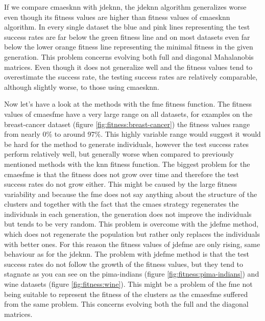 \documentclass[12pt,a4paper]{report}
\begin{document}
If we compare \ac{cmaesknn} with \ac{jdeknn}, the \ac{jdeknn} algorithm generalizes worse even though its fitness values are higher than fitness values of \ac{cmaesknn} algorithm. In every single dataset the blue and pink lines representing the test success rates are far below the green fitness line and on most datasets even far below the lower orange fitness line representing the minimal fitness in the given generation. This problem concerns evolving both full and diagonal Mahalanobis matrices. Even though it does not generalize well and the fitness values tend to overestimate the success rate, the testing success rates are relatively comparable, although slightly worse, to those using \ac{cmaesknn}.

Now let's have a look at the methods with the \ac{fme} fitness function. The fitness values of \ac{cmaesfme} have a very large range on all datasets, for examples on the breast-cancer dataset (figure \ref{fig:fitness:breast-cancer}) the fitness values range from nearly 0\% to around 97\%. This highly variable range would suggest it would be hard for the method to generate individuals, however the test success rates perform relatively well, but generally worse when compared to previously mentioned methods with the \ac{knn} fitness function. The biggest problem for the \ac{cmaesfme} is that the fitness does not grow over time and therefore the test success rates do not grow either. This might be caused by the large fitness variability and because the \ac{fme} does not say anything about the structure of the clusters and together with the fact that the \ac{cmaes} strategy regenerates the individuals in each generation, the generation does not improve the individuals but tends to be very random. This problem is overcome with the \ac{jdefme} method, which does not regenerate the population but rather only replaces the individuals with better ones. For this reason the fitness values of \ac{jdefme} are only rising, same behaviour as for the \ac{jdeknn}. The problem with \ac{jdefme} method is that the test success rates do not follow the growth of the fitness values, but they tend to stagnate as you can see on the pima-indians (figure \ref{fig:fitness:pima-indians}) and wine datasets (figure \ref{fig:fitness:wine}). This might be a problem of the \ac{fme} not being suitable to represent the fitness of the clusters as the \ac{cmaesfme} suffered from the same problem. This concerns evolving both the full and the diagonal matrices.
\end{document}
